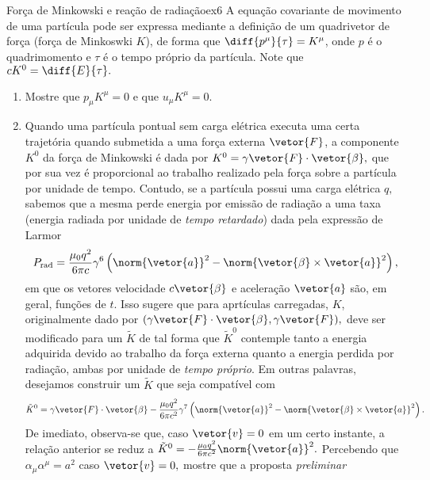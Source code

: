\begin{exercício}{Força de Minkowski e reação de radiação}{ex6}
   A equação covariante de movimento de uma partícula pode ser expressa mediante a definição de um quadrivetor de força (força de Minkoswki \(K\)), de forma que \(\diff{p^\mu}{\tau} = K^\mu\),
   onde \(p\) é o quadrimomento e \(\tau\) é o tempo próprio da partícula. Note que \(c K^0 = \diff{E}{\tau}.\)
   \begin{enumerate}[label=(\alph*)]
      \item Mostre que \(p_\mu K^\mu = 0\) e que \(u_\mu K^\mu = 0.\)
      \item Quando uma partícula pontual sem carga elétrica executa uma certa trajetória quando submetida a uma força externa \(\vetor{F}\), a componente \(K^0\) da força de Minkowski é dada por \(K^0 = \gamma \vetor{F} \cdot \vetor{\beta},\) que por sua vez é proporcional ao trabalho realizado pela força sobre a partícula por unidade de tempo. Contudo, se a partícula possui uma carga elétrica \(q,\) sabemos que a mesma perde energia por emissão de radiação a uma taxa (energia radiada por unidade de \emph{tempo retardado}) dada pela expressão de Larmor
      \begin{equation*}
         P_\mathrm{rad} = \frac{\mu_0 q^2}{6\pi c}\gamma^6 \left(\norm{\vetor{a}}^2 - \norm{\vetor{\beta}\times\vetor{a}}^2\right),
      \end{equation*}
      em que os vetores velocidade \(c\vetor{\beta}\) e aceleração \(\vetor{a}\) são, em geral, funções de \(t\). Isso sugere que para aprtículas carregadas, \(K\), originalmente dado por \((\gamma \vetor{F} \cdot \vetor{\beta}, \gamma \vetor{F}),\) deve ser modificado para um \(\tilde{K}\) de tal forma que \(\tilde{K}^0\) contemple tanto a energia adquirida devido ao trabalho da força externa quanto a energia perdida por radiação, ambas por unidade de \emph{tempo próprio}. Em outras palavras, desejamos construir um \(\tilde{K}\) que seja compatível com 
      \begin{equation*}
         \tilde{K}^0 = \gamma \vetor{F} \cdot \vetor{\beta} - \frac{\mu_0 q^2}{6\pi c^2} \gamma^7 \left(\norm{\vetor{a}}^2 - \norm{\vetor{\beta} \times \vetor{a}}^2\right).
      \end{equation*}
      De imediato, observa-se que, caso \(\vetor{v} = 0\) em um certo instante, a relação anterior se reduz a \(\tilde{K}^0 = - \frac{\mu_0 q^2}{6\pi c^2} \norm{\vetor{a}}^2.\) Percebendo que \(\alpha_\mu \alpha^\mu = a^2\) caso \(\vetor{v} = 0,\) mostre que a proposta \emph{preliminar}

\end{enumerate}
\end{exercício}
